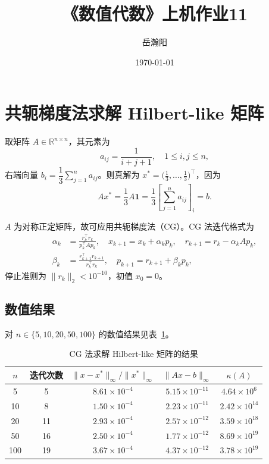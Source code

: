 \documentclass[10pt, a4paper]{article}
\title{\textbf{《数值代数》上机作业11}}
\author{岳瀚阳\quad\quad\quad\quad 3230104443}
\date{\today}
\begin{document}
\maketitle

\section{共轭梯度法求解 Hilbert-like 矩阵}

取矩阵 $A\in\mathbb{R}^{n\times n}$，其元素为
\[
a_{ij} = \frac{1}{i+j+1}, \quad 1\leq i,j\leq n,
\]
右端向量 $b_i = \dfrac{1}{3}\displaystyle\sum_{j=1}^{n}a_{ij}$。则真解为 $x^* = \bigl(\tfrac{1}{3},\ldots,\tfrac{1}{3}\bigr)^\top$，因为
\[
A x^* = \frac{1}{3} A \mathbf{1} = \frac{1}{3}\left[\sum_{j=1}^n a_{ij}\right]_i = b.
\]

$A$ 为对称正定矩阵，故可应用共轭梯度法（CG）。CG 法迭代格式为
\begin{align*}
\alpha_k &= \frac{r_k^\top r_k}{p_k^\top A p_k}, \quad
x_{k+1} = x_k + \alpha_k p_k, \quad
r_{k+1} = r_k - \alpha_k A p_k,\\
\beta_k &= \frac{r_{k+1}^\top r_{k+1}}{r_k^\top r_k}, \quad
p_{k+1} = r_{k+1} + \beta_k p_k,
\end{align*}
停止准则为 $\|r_k\|_2 < 10^{-10}$，初值 $x_0 = 0$。

\subsection{数值结果}

对 $n\in\{5,10,20,50,100\}$ 的数值结果见表~\ref{tab:hilbert}。

\begin{table}[H]
    \centering
    \caption{CG 法求解 Hilbert-like 矩阵的结果}
    \label{tab:hilbert}
    \begin{tabular}{ccccc}
        \toprule
        $n$ & 迭代次数 & $\|x-x^*\|_\infty / \|x^*\|_\infty$ & $\|Ax-b\|_\infty$ & $\kappa(A)$ \\
        \midrule
        5   & 5  & $8.61\times10^{-4}$ & $5.15\times10^{-11}$ & $4.64\times10^{6}$  \\
        10  & 8  & $1.50\times10^{-4}$ & $2.23\times10^{-11}$ & $2.42\times10^{14}$ \\
        20  & 11 & $2.93\times10^{-4}$ & $2.57\times10^{-12}$ & $3.59\times10^{18}$ \\
        50  & 16 & $2.50\times10^{-4}$ & $1.77\times10^{-12}$ & $8.69\times10^{19}$ \\
        100 & 19 & $3.67\times10^{-4}$ & $4.37\times10^{-12}$ & $3.78\times10^{19}$ \\
        \bottomrule
    \end{tabular}
\end{table}
\end{document}
